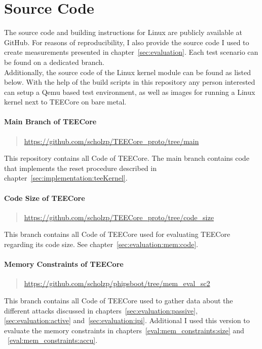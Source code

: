 \chapter{Source Code}

The source code and building instructions for Linux are publicly available at
GitHub. For reasons of reproducibility, I also provide the source code I used to
create measurements presented in chapter~\ref{sec:evaluation}. Each test
scenario can be found on a dedicated branch.\\
Additionally, the source code of the Linux kernel module can be found as listed
below. With the help of the build scripts in this repository any person
interested can setup a Qemu based test environment, as well as images for
running a Linux kernel next to TEECore on bare metal.

\subsubsection{Main Branch of TEECore}
\begin{quote}
  \url{https://github.com/scholzp/TEECore_proto/tree/main}
\end{quote}

\noindent
This repository contains all Code of TEECore. The main branch contains code that
implements the reset procedure described in
chapter~\ref{sec:implementation:teeKernel}.

\subsubsection{Code Size of TEECore}
\begin{quote}
  \url{https://github.com/scholzp/TEECore_proto/tree/code_size}
\end{quote}

\noindent
This branch contains all Code of TEECore used for evaluating TEECore regarding
its code size. See chapter~\ref{sec:evaluation:mem:code}.

\subsubsection{Memory Constraints of TEECore}
\begin{quote}
  \url{https://github.com/scholzp/phipsboot/tree/mem_eval_sc2}
\end{quote}

\noindent
This branch contains all Code of TEECore used to gather data about the different
attacks discussed in chapters~\ref{sec:evaluation:passive},
\ref{sec:evaluation:active} and~\ref{sec:evaluation:ipi}. Additional I used this
version to evaluate the memory constraints in
chapters~\ref{eval:mem_constraints:size} and ~\ref{eval:mem_constraints:accu}.

